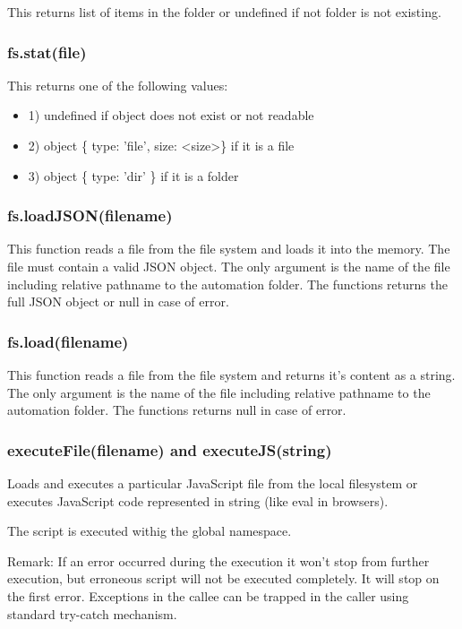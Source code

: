 This returns list of items in the folder or undefined if not folder is not existing.


\subsubsection{fs.stat(file)}

This returns one of the following values:

\begin{itemize}
\item 1) undefined if object does not exist or not readable
\item 2) object \{ type: 'file', size: \textless{}size\textgreater{}\} if it is a file
\item 3) object \{ type: 'dir' \} if it is a folder
\end{itemize} 


\subsubsection{fs.loadJSON(filename)}

This function reads a file from the file system and loads it into the memory. The file 
must contain a valid JSON object. The only argument is the name of the file including 
relative pathname to the automation folder. The functions returns the full JSON object or 
null in case of error.

\subsubsection{fs.load(filename)}

This function reads a file from the file system and returns it's content as a string. The 
only argument is the name of the file including relative pathname to the automation folder.
 The functions returns null in case of error.

\subsubsection{executeFile(filename) and executeJS(string)}

Loads and executes a particular JavaScript file from the local filesystem or executes 
JavaScript code represented in string (like eval in browsers).

The script is executed withig the global namespace.

Remark: If an error occurred during the execution it won't stop from further execution, 
but erroneous script will not be executed completely. It will stop on the first error.
Exceptions in the callee can be trapped in the caller using standard try-catch mechanism.

